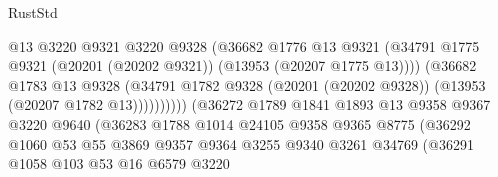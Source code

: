 \begin{lexlean}{RustStd}
\begin{coremodule}
                                          @13
                                          @3220
                                          @9321
                                          @3220
                                          @9328
                                          (@36682
                                            @1776
                                            @13
                                            @9321
                                            (@34791
                                              @1775
                                              @9321
                                              (@20201 (@20202 @9321))
                                              (@13953 (@20207 @1775 @13))))
                                          (@36682
                                            @1783
                                            @13
                                            @9328
                                            (@34791
                                              @1782
                                              @9328
                                              (@20201 (@20202 @9328))
                                              (@13953 (@20207 @1782 @13))))))))))
                              (@36272
                                @1789
                                @1841
                                @1893
                                @13
                                @9358
                                @9367
                                @3220
                                @9640
                                (@36283
                                  @1788
                                  @1014
                                  @24105
                                  @9358
                                  @9365
                                  @8775
                                  (@36292
                                    @1060
                                    @53
                                    @55
                                    @3869
                                    @9357
                                    @9364
                                    @3255
                                    @9340
                                    @3261
                                    @34769
                                    (@36291
                                      @1058
                                      @103
                                      @53
                                      @16
                                      @6579
                                      @3220

\end{coremodule}
\end{lexlean}
